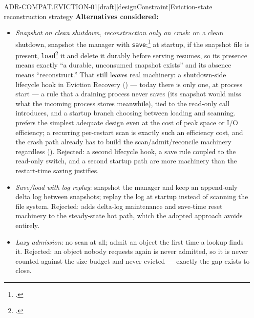 \begin{requirement}{ADR-COMPAT.EVICTION-01}[draft][designConstraint]{Eviction-state reconstruction strategy}
  \textbf{Alternatives considered:}
  \begin{itemize}
    \item \emph{Snapshot on clean shutdown, reconstruction
      only on crash}: on a clean shutdown, snapshot the manager with
      \texttt{save};\footnote{.}
      at startup, if the snapshot file is present, \texttt{load}\footnote{.}
      it and delete it durably before serving resumes, so its presence
      means exactly ``a durable, unconsumed snapshot exists'' and its
      absence means ``reconstruct.'' That still leaves real machinery: a
      shutdown-side lifecycle hook in Eviction Recovery
      () --- today there is only one, at
      process start --- a rule that a draining process never saves (its
      snapshot would miss what the incoming process stores meanwhile), tied
      to the read-only call  introduces, and a
      startup branch choosing between loading and scanning.
       prefers the simplest adequate design even at
      the cost of peak space or I/O efficiency; a recurring per-restart scan
      is exactly such an efficiency cost, and the crash path already has to
      build the scan/admit/reconcile machinery regardless
      (). Rejected: a second lifecycle hook,
      a save rule coupled to the read-only switch, and a second startup path are more
      machinery than the restart-time saving justifies.
    \item \emph{Save/load with log replay}: snapshot the manager and keep an
      append-only delta log between snapshots; replay the log at startup
      instead of scanning the file system. Rejected: adds delta-log maintenance
      and save-time reset machinery to the steady-state hot path, which the
      adopted approach avoids entirely.
    \item \emph{Lazy admission}: no scan at all; admit an object the first
      time a lookup finds it. Rejected: an object nobody requests again is
      never admitted, so it is never counted against the size budget and
      never evicted --- exactly the gap 
      exists to close.
  \end{itemize}


\end{requirement}
